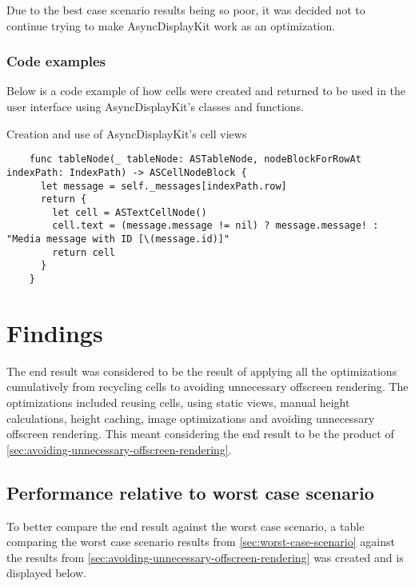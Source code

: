 \documentclass[a4paper,12pt]{article}
\begin{document}
Due to the best case scenario results being so poor, it was decided not to continue trying to make AsyncDisplayKit work as an optimization.

\subsubsection{Code examples}
Below is a code example of how cells were created and returned to be used in the user interface using AsyncDisplayKit's classes and functions.
\begin{listing}[H]
  \caption{Creation and use of AsyncDisplayKit's cell views}
  \begin{verbatim}
    func tableNode(_ tableNode: ASTableNode, nodeBlockForRowAt indexPath: IndexPath) -> ASCellNodeBlock {
      let message = self._messages[indexPath.row]
      return {
        let cell = ASTextCellNode()
        cell.text = (message.message != nil) ? message.message! : "Media message with ID [\(message.id)]"
        return cell
      }
    }
  \end{verbatim}
\end{listing}

\section{Findings}
The end result was considered to be the result of applying all the optimizations cumulatively from recycling cells to avoiding unnecessary offscreen rendering. The optimizations included reusing cells, using static views, manual height calculations, height caching, image optimizations and avoiding unnecessary offscreen rendering. This meant considering the end result to be the product of \autoref{sec:avoiding-unnecessary-offscreen-rendering}.

\subsection{Performance relative to worst case scenario}
To better compare the end result against the worst case scenario, a table comparing the worst case scenario results from \autoref{sec:worst-case-scenario} against the results from \autoref{sec:avoiding-unnecessary-offscreen-rendering} was created and is displayed below.
\end{document}

